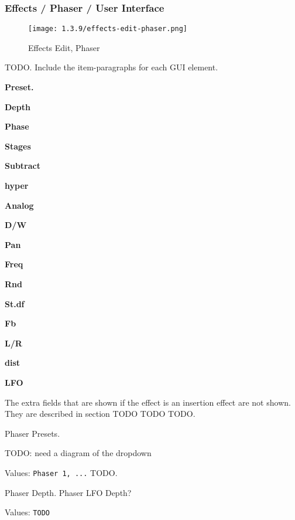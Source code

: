 \subsubsection{Effects / Phaser / User Interface}
\label{subsubsec:effects_edit_phaser_ui}

\begin{figure}[H]
   \centering 
   \texttt{[image: 1.3.9/effects-edit-phaser.png]}
   \caption{Effects Edit, Phaser}
   \label{fig:effects_edit_phaser}
\end{figure}

   TODO. Include the item-paragraphs for each GUI element.

   \begin{enumber}
      \item \textbf{Preset.}
      \item \textbf{Depth}
      \item \textbf{Phase}
      \item \textbf{Stages}
      \item \textbf{Subtract}
      \item \textbf{hyper}
      \item \textbf{Analog}
      \item \textbf{D/W}
      \item \textbf{Pan}
      \item \textbf{Freq}
      \item \textbf{Rnd}
      \item \textbf{St.df}
      \item \textbf{Fb}
      \item \textbf{L/R}
      \item \textbf{dist}
      \item \textbf{LFO}
   \end{enumber}

   The extra fields that are shown if the effect is an insertion effect are
   not shown.  They are described in section TODO TODO TODO.

   Phaser Presets.

   TODO: need a diagram of the dropdown

   Values: \texttt{Phaser 1, ...} TODO.

   Phaser Depth. Phaser LFO Depth?

   Values: \texttt{TODO}

